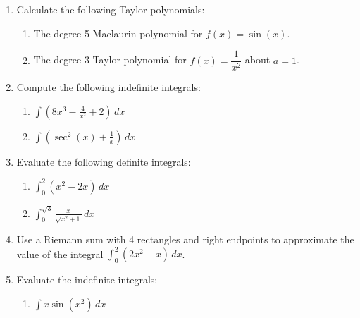 \documentclass[12pt]{article}
\newcommand{\points}[1]{\marginpar{\hspace{24pt}[#1]}}
\newcommand{\di}{\displaystyle}
\begin{document}
\begin{enumerate}
  \vspace{2in}
  
  
  \item Calculate the following Taylor polynomials:
  \begin{enumerate}
  \item The degree 5 Maclaurin polynomial for $f(x)=\sin(x)$. \points{3}
  
  \vspace{2.75in}
  
  \item The degree 3 Taylor polynomial for $f(x) = \dfrac{1}{x^2}$ about $a=1$. \points{4}
  \end{enumerate}
  
  \newpage
  
  \item Compute the following indefinite integrals:
  \begin{enumerate}
  \item $\di \int \left(8x^3 - \frac{4}{x^2}+2\right)\,dx$ \points{2}
  
  \vspace{1.25in}
  
  \item $\di \int\left(\sec^2(x)+\frac{1}{x}\right)\,dx$ \points{2}
  \end{enumerate}
  
  \vspace{1.25in}
  
    \item Evaluate the following definite integrals:
  \begin{enumerate}
  \item $\di \int_0^2(x^2-2x)\,dx$ \points{3}
  
  \vspace{1.5in}
  
  \item $\di \int_0^{\sqrt{3}}\frac{x}{\sqrt{x^2+1}}\,dx$ \points{3}
  \end{enumerate}
  
  \newpage
  
  \item Use a Riemann sum with 4 rectangles and right endpoints to approximate the value of the integral $\di \int_0^2 (2x^2-x)\,dx$. \points{4}
  
  \vspace{3.25in}

\item Evaluate the indefinite integrals: 
  \begin{enumerate}
  \item $\di \int x\sin(x^2)\,dx$ \points{3}
  

\end{enumerate}
\end{enumerate}
\end{document}

